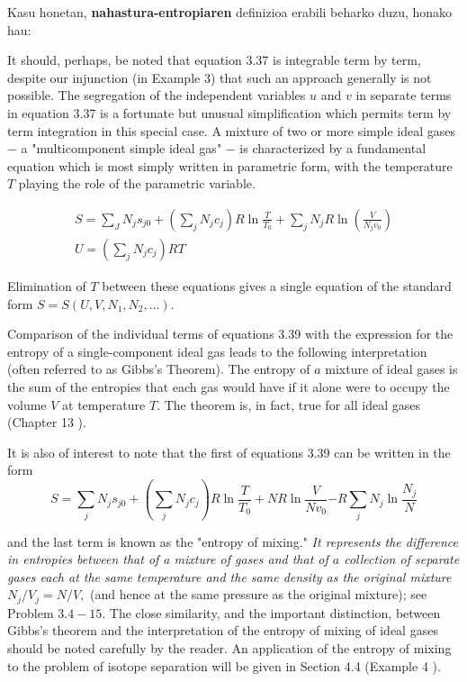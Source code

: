 \documentclass[10pt]{article}              %
\begin{document}
\begin{enumerate}
\begin{enumerate}
Kasu honetan, \textbf{nahastura-entropiaren} definizioa erabili beharko duzu, honako hau:\\

\begin{flushright}
\begin{minipage}[c]{0.75\textwidth}
\small{It should, perhaps, be noted that equation 3.37 is integrable term by term, despite our injunction (in Example 3) that such an approach generally is not possible. The segregation of the independent variables $u$ and $v$ in separate terms in equation 3.37 is a fortunate but unusual simplification which permits term by term integration in this special case. A mixture of two or more simple ideal gases $-$ a "multicomponent simple ideal gas" $-$ is characterized by a fundamental equation which is most simply written in parametric form, with the temperature $T$ playing the role of the parametric variable.

$$
\begin{array}{l}
S=\sum_{J} N_{j} s_{j 0}+\left(\sum_{j} N_{j} c_{j}\right) R \ln \frac{T}{T_{0}}+\sum_{j} N_{j} R \ln \left(\frac{V}{N_{j} v_{0}}\right) \\
U=\left(\sum_{j} N_{j} c_{j}\right) R T
\end{array}
$$

Elimination of $T$ between these equations gives a single equation of the standard form $S=S\left(U, V, N_{1}, N_{2}, \ldots\right) .$

Comparison of the individual terms of equations 3.39 with the expression for the entropy of a single-component ideal gas leads to the following interpretation (often referred to as Gibbs's Theorem). The entropy of $a$ mixture of ideal gases is the sum of the entropies that each gas would have if it alone were to occupy the volume $V$ at temperature $T .$ The theorem is, in fact, true for all ideal gases (Chapter 13 ).

It is also of interest to note that the first of equations 3.39 can be written in the form
$$
S=\sum_{j} N_{j} s_{j 0}+\left(\sum_{j} N_{j} c_{j}\right) R \ln \frac{T}{T_{0}}+N R \ln \frac{V}{N v_{0}} \boxed{- R \sum_{j} N_{j} \ln \frac{N_{j}}{N}}
$$


and the last term is known as the "entropy of mixing." \textit{It represents the difference in entropies between that of a mixture of gases and that of $a$ collection of separate gases each at the same temperature and the same density as the original mixture} $N_{j} / V_{j}=N / V,$ (and hence at the same pressure as the original mixture); see Problem $3.4-15 .$ The close similarity, and the important distinction, between Gibbs's theorem and the interpretation of the entropy of mixing of ideal gases should be noted carefully by the reader. An application of the entropy of mixing to the problem of isotope separation will be given in Section 4.4 (Example 4 ).}


\end{minipage}
\end{flushright}
\end{enumerate}
\end{enumerate}
\end{document}
